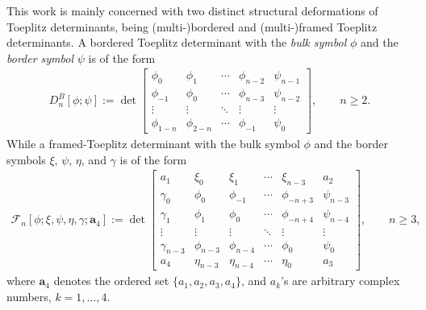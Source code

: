 \documentclass[10pt,a4paper]{amsart}
\numberwithin{equation}{section}
\newcommand{\ga}{\gamma}
\begin{document}
This work is mainly concerned with two distinct structural deformations of Toeplitz determinants, being (multi-)bordered and (multi-)framed Toeplitz determinants. A bordered Toeplitz determinant with the \textit{bulk symbol} $\phi$ and the \textit{border symbol} $\psi$ is of the form
\begin{gather}\label{btd0}
	D^{B}_{n}[\phi; \psi] := \det \begin{bmatrix}
		\phi_0& \phi_1 & \cdots & \phi_{n-2} & \psi_{n-1}\\
		\phi_{-1}& \phi_0 & \cdots & \phi_{n-3}&\psi_{n-2} \\
		\vdots & \vdots & \ddots & \vdots & \vdots\\
		\phi_{1-n} & \phi_{2-n} & \cdots & \phi_{-1}&\psi_{0}
	\end{bmatrix}, \qquad n \geq 2.
\end{gather}
While a framed-Toeplitz determinant with the bulk symbol $\phi$ and the border symbols $\xi$, $\psi$, $\eta$, and $\ga$ is of the form
\begin{gather}\label{framed intro}
	\mathscr{F}_{n}\left[\phi; \xi, \psi, \eta, \ga; \boldsymbol{a}_4\right] := \det \begin{bmatrix}
		a_1 & \xi_{0} & \xi_{1} & \cdots & \xi_{n-3} & a_2 \\
		\ga_{0} &	\phi_0& \phi_{-1} & \cdots & \phi_{-n+3} & \psi_{n-3} \\
		\ga_{1} &	\phi_{1}& \phi_0 & \cdots & \phi_{-n+4} & \psi_{n-4} \\
		\vdots &	\vdots & \vdots & \ddots & \vdots & \vdots \\
		\ga_{n-3} &	\phi_{n-3} & \phi_{n-4} & \cdots & \phi_{0} & \psi_{0} \\
		a_4 &	\eta_{n-3} & \eta_{n-4} & \cdots & \eta_{0} & a_3
	\end{bmatrix}, \qquad n \geq 3,
\end{gather}
where $\boldsymbol{a}_4$ denotes the ordered set $\{a_1, a_2, a_3, a_4\}$, and $a_k$'s are arbitrary complex numbers, ${k=1,\dots,4}$.
\end{document}
